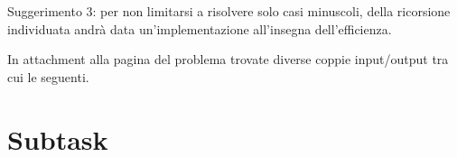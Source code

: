 Suggerimento 3: per non limitarsi a risolvere solo casi minuscoli, della ricorsione individuata andrà data un'implementazione all'insegna dell'efficienza.



In attachment alla pagina del problema trovate diverse coppie input/output tra cui le seguenti.

\vspace{0.5cm}

\vspace{0.5cm}

\vspace{0.5cm}

\vspace{0.5cm}

\vspace{0.5cm}

\newpage

\section*{Subtask}

